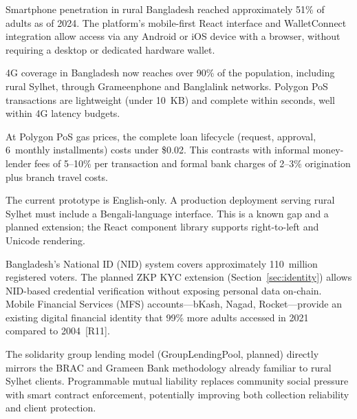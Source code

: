 \documentclass[12pt,a4paper]{report}
\begin{document}
\begin{description}[leftmargin=0pt]

\item[\textbf{1. Device access.}] Smartphone penetration in rural Bangladesh reached approximately 51\% of adults as of 2024. The platform's mobile-first React interface and WalletConnect integration allow access via any Android or iOS device with a browser, without requiring a desktop or dedicated hardware wallet.

\item[\textbf{2. Connectivity.}] 4G coverage in Bangladesh now reaches over 90\% of the population, including rural Sylhet, through Grameenphone and Banglalink networks. Polygon PoS transactions are lightweight (under 10~KB) and complete within seconds, well within 4G latency budgets.

\item[\textbf{3. Transaction cost.}] At Polygon PoS gas prices, the complete loan lifecycle (request, approval, 6~monthly installments) costs under \$0.02. This contrasts with informal money-lender fees of 5--10\% per transaction and formal bank charges of 2--3\% origination plus branch travel costs.

\item[\textbf{4. Language and literacy.}] The current prototype is English-only. A production deployment serving rural Sylhet must include a Bengali-language interface. This is a known gap and a planned extension; the React component library supports right-to-left and Unicode rendering.

\item[\textbf{5. Identity and onboarding.}] Bangladesh's National ID (NID) system covers approximately 110~million registered voters. The planned ZKP KYC extension (Section~\ref{sec:identity}) allows NID-based credential verification without exposing personal data on-chain. Mobile Financial Services (MFS) accounts---bKash, Nagad, Rocket---provide an existing digital financial identity that 99\% more adults accessed in 2021 compared to 2004~[R11].

\item[\textbf{6. Group lending fit.}] The solidarity group lending model (GroupLendingPool, planned) directly mirrors the BRAC and Grameen Bank methodology already familiar to rural Sylhet clients. Programmable mutual liability replaces community social pressure with smart contract enforcement, potentially improving both collection reliability and client protection.

\end{description}
\end{document}
